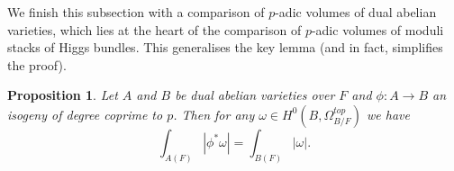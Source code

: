 \documentclass{article}
\DeclareMathOperator{\A}{\mathsf{A}}
\DeclareMathOperator{\Oo}{\mathcal{O}}
\theoremstyle{definition}
\theoremstyle{plain}
\newtheorem{proposition}[definition]{Proposition}
\begin{document}
We finish this subsection with a comparison of $p$-adic volumes of dual abelian varieties, which lies at the heart of the comparison of $p$-adic volumes of moduli stacks of Higgs bundles. This generalises the key lemma \cite[Lemma 4.11]{gwz} (and in fact, simplifies the proof).



\begin{proposition}\label{abvol}
Let $A$ and $B$ be dual abelian varieties over $F$ and $\phi: A \to B$ an isogeny of degree coprime to $p$. Then for any $\omega \in H^0(B,\Omega_{B/F}^{top})$ we have
\[\int_{A(F)} |\phi^* \omega| = \int_{B(F)} |\omega|.\]
\end{proposition}
\end{document}

